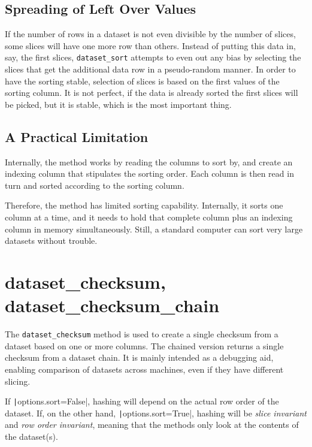 \subsection*{Spreading of Left Over Values}
If the number of rows in a dataset is not even divisible by the number
of slices, some slices will have one more row than others.  Instead of
putting this data in, say, the first slices, \texttt{dataset\_sort}
attempts to even out any bias by selecting the slices that get the
additional data row in a pseudo-random manner.  In order to have the
sorting stable, selection of slices is based on the first values of
the sorting column.  It is not perfect, if the data is already sorted
the first slices will be picked, but it is stable, which is the most
important thing.





\subsection{A Practical Limitation}
Internally, the method works by reading the columns to sort by, and
create an indexing column that stipulates the sorting order.  Each
column is then read in turn and sorted according to the sorting
column.

Therefore, the method has limited sorting capability.  Internally, it
sorts one column at a time, and it needs to hold that complete column
plus an indexing column in memory simultaneously.  Still, a standard
computer can sort very large datasets without trouble.






\clearpage
\section{dataset\_checksum, dataset\_checksum\_chain}

The \texttt{dataset\_checksum} method is used to create a single
checksum from a dataset based on one or more columns.  The chained
version returns a single checksum from a dataset chain.  It is mainly
intended as a debugging aid, enabling comparison of datasets across
machines, even if they have different slicing.

If \texttt|options.sort=False|, hashing will depend on the
actual row order of the dataset.  If, on the other
hand, \texttt|options.sort=True|, hashing will
be \textsl{slice invariant} and \textsl{row order invariant}, meaning
that the methods only look at the contents of the dataset(s).

